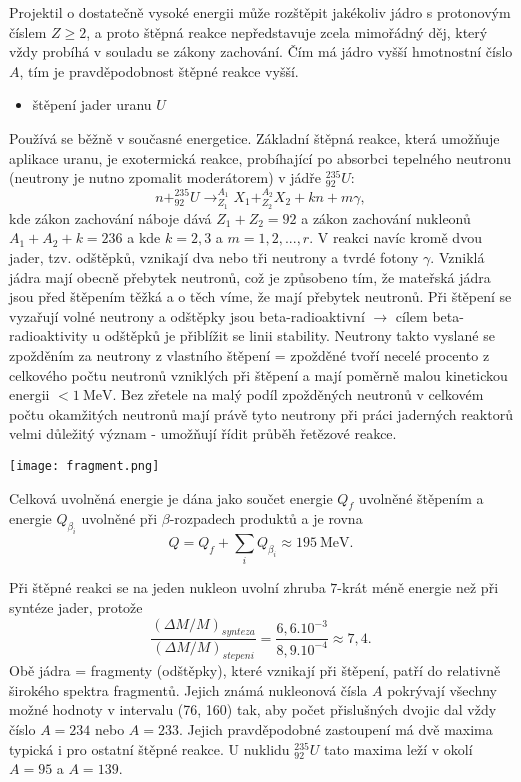 \documentclass[../../main.tex]{subfiles}
\begin{document}
Projektil o dostatečně vysoké energii může rozštěpit jakékoliv jádro s protonovým číslem $Z \geq 2$, a proto štěpná reakce nepředstavuje zcela mimořádný děj, který vždy probíhá v souladu se zákony zachování. Čím má jádro vyšší hmotnostní číslo $A$, tím je pravděpodobnost štěpné reakce vyšší.
\begin{itemize}
	\item štěpení jader uranu $U$
\end{itemize}  
Používá se běžně v současné energetice. Základní štěpná reakce, která  umožňuje aplikace uranu, je exotermická reakce, probíhající po absorbci tepelného neutronu (neutrony je nutno zpomalit moderátorem) v jádře $^{235}_{92} U$:
\begin{equation}
n + ^{235}_{92} U \rightarrow ^{A_1}_{Z_1} X_1 + ^{A_2}_{Z_2} X_2 + kn + m \gamma,
\end{equation}
kde zákon zachování náboje dává $Z_1 + Z_2 = 92$ a zákon zachování nukleonů $A_1 + A_2 + k = 236$ a kde $k = 2, 3$ a $m = 1, 2, ..., r$. V reakci navíc kromě dvou jader, tzv. odštěpků, vznikají dva nebo tři neutrony a tvrdé fotony $\gamma$. Vzniklá jádra mají obecně přebytek neutronů, což je způsobeno tím, že mateřská jádra jsou před štěpením těžká a o těch víme, že mají přebytek neutronů. Při štěpení se vyzařují volné neutrony a odštěpky jsou beta-radioaktivní $\rightarrow$ cílem beta-radioaktivity u odštěpků je přiblížit se linii stability. Neutrony takto vyslané se zpožděním za neutrony z vlastního štěpení = zpožděné tvoří necelé procento z celkového počtu neutronů vzniklých při štěpení a mají poměrně malou kinetickou energii $< 1 ~\mathrm{MeV}$. Bez zřetele na malý podíl zpožděných neutronů v celkovém počtu okamžitých neutronů mají právě tyto neutrony při práci jaderných reaktorů velmi důležitý význam - umožňují řídit průběh řetězové reakce. 

\begin{center}
	\texttt{[image: fragment.png]}
\end{center}

Celková uvolněná energie je dána jako součet energie $Q_f$ uvolněné štěpením a energie $Q_{\beta _i}$ uvolněné při $\beta$-rozpadech produktů a je rovna
\begin{equation}
Q = Q_f + \sum_{i} Q_{\beta_i} \approx 195 ~\mathrm{MeV}.
\end{equation}

Při štěpné reakci se na jeden nukleon uvolní zhruba $7$-krát méně energie než při syntéze jader, protože
\begin{equation}
\dfrac{(\Delta M/M)_{synteza}}{(\Delta M /M)_{stepeni}} = \dfrac{6,6.10^{-3}}{8,9.10^{-4}} \approx 7,4.
\end{equation}
Obě jádra = fragmenty (odštěpky), které vznikají při štěpení, patří do relativně širokého spektra fragmentů. Jejich známá nukleonová čísla $A$ pokrývají všechny možné hodnoty v intervalu (76, 160) tak, aby počet přislušných dvojic dal vždy číslo $A = 234$ nebo $A = 233$. Jejich pravděpodobné zastoupení má dvě maxima typická i pro ostatní štěpné reakce. U nuklidu $^{235}_{92} U$ tato maxima leží v okolí $A = 95$ a $A = 139$.
\end{document}
